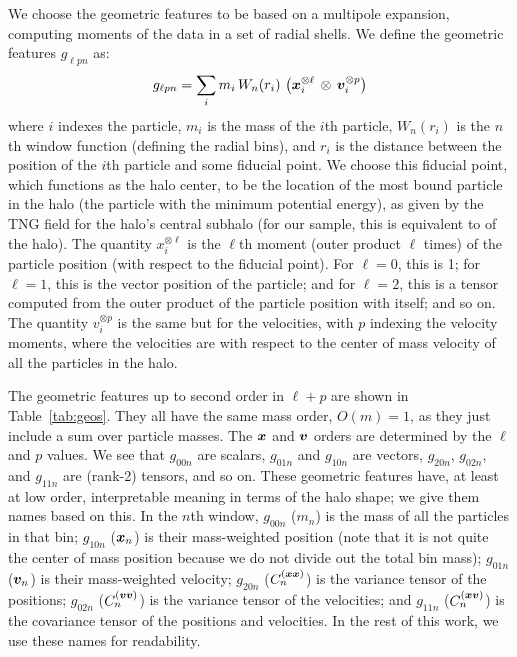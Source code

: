 We choose the geometric features to be based on a multipole expansion, computing moments of the data in a set of radial shells. 
We define the geometric features $g_{\ell p n}$ as: 
\label{eq:geo}
\begin{equation}
    g_{\ell p n} = \sum_i m_i \, W_n(r_i) \, \left( \bm{x}_i^{\otimes \ell} \, \otimes \, \bm{v}_i^{\otimes p} \right)
\end{equation}
where $i$ indexes the particle, $m_i$ is the mass of the $i$th particle, $W_n(r_i)$ is the $n$th window function (defining the radial bins), and $r_i$ is the distance between the position of the $i$th particle and some fiducial point.
We choose this fiducial point, which functions as the halo center, to be the location of the most bound particle in the halo (the particle with the minimum potential energy), as given by the TNG field  for the halo's central subhalo (for our sample, this is equivalent to  of the \dark halo).
The quantity $x_i^{\otimes \ell}$ is the $\ell$th moment (outer product $\ell$ times) of the particle position (with respect to the fiducial point).
For $\ell = 0$, this is 1; for $\ell = 1$, this is the vector position of the particle; and for $\ell = 2$, this is a tensor computed from the outer product of the particle position with itself; and so on.
The quantity $v_i^{\otimes p}$ is the same but for the velocities, with $p$ indexing the velocity moments, where the velocities are with respect to the center of mass velocity of all the particles in the halo.

The geometric features up to second order in $\ell + p$ are shown in Table~\ref{tab:geos}.
They all have the same mass order, $O(m)=1$, as they just include a sum over particle masses.
The $\bm{x}$ and $\bm{v}$ orders are determined by the $\ell$ and $p$ values.
We see that $g_{00n}$ are scalars, $g_{01n}$ and $g_{10n}$ are vectors, $g_{20n}$, $g_{02n}$, and $g_{11n}$ are (rank-2) tensors, and so on.
These geometric features have, at least at low order, interpretable meaning in terms of the halo shape; we give them names based on this.
In the $n$th window, $g_{00n}$ ($m_n$) is the mass of all the particles in that bin; $g_{10n}$ ($\bm{x}_n$) is their mass-weighted position (note that it is not quite the center of mass position because we do not divide out the total bin mass); $g_{01n}$ ($\bm{v}_n$) is their mass-weighted velocity; $g_{20n}$ ($C^{(\bm{x}\bm{x})}_n$) is the variance tensor of the positions; $g_{02n}$ ($C^{(\bm{v}\bm{v})}_n$) is the variance tensor of the velocities; and $g_{11n}$ ($C^{(\bm{x}\bm{v})}_n$) is the covariance tensor of the positions and velocities.
In the rest of this work, we use these names for readability.

